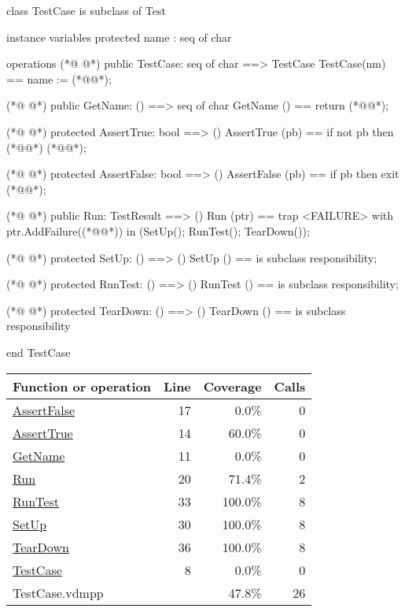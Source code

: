 \begin{vdmpp}[breaklines=true]
class TestCase
  is subclass of Test

instance variables
  protected name : seq of char

operations
(*@
\label{TestCase:8}
@*)
  public TestCase: seq of char ==> TestCase
  TestCase(nm) == name := (*@@*);

(*@
\label{GetName:11}
@*)
  public GetName: () ==> seq of char
  GetName () == return (*@@*);

(*@
\label{AssertTrue:14}
@*)
  protected AssertTrue: bool ==> ()
  AssertTrue (pb) == if not pb then (*@@*) (*@@*);

(*@
\label{AssertFalse:17}
@*)
  protected AssertFalse: bool ==> ()
  AssertFalse (pb) == if pb then exit (*@@*);

(*@
\label{Run:20}
@*)
  public Run: TestResult ==> ()
  Run (ptr) ==
    trap <FAILURE>
      with 
        ptr.AddFailure((*@@*))
      in
        (SetUp();
  RunTest();
  TearDown());

(*@
\label{SetUp:30}
@*)
  protected SetUp: () ==> ()
  SetUp () == is subclass responsibility;

(*@
\label{RunTest:33}
@*)
  protected RunTest: () ==> ()
  RunTest () == is subclass responsibility;

(*@
\label{TearDown:36}
@*)
  protected TearDown: () ==> ()
  TearDown () == is subclass responsibility

end TestCase
\end{vdmpp}
\bigskip
\begin{longtable}{|l|r|r|r|}
\hline
Function or operation & Line & Coverage & Calls \\
\hline
\hline
\hyperref[AssertFalse:17]{AssertFalse} & 17&0.0\% & 0 \\
\hline
\hyperref[AssertTrue:14]{AssertTrue} & 14&60.0\% & 0 \\
\hline
\hyperref[GetName:11]{GetName} & 11&0.0\% & 0 \\
\hline
\hyperref[Run:20]{Run} & 20&71.4\% & 2 \\
\hline
\hyperref[RunTest:33]{RunTest} & 33&100.0\% & 8 \\
\hline
\hyperref[SetUp:30]{SetUp} & 30&100.0\% & 8 \\
\hline
\hyperref[TearDown:36]{TearDown} & 36&100.0\% & 8 \\
\hline
\hyperref[TestCase:8]{TestCase} & 8&0.0\% & 0 \\
\hline
\hline
TestCase.vdmpp & & 47.8\% & 26 \\
\hline
\end{longtable}


